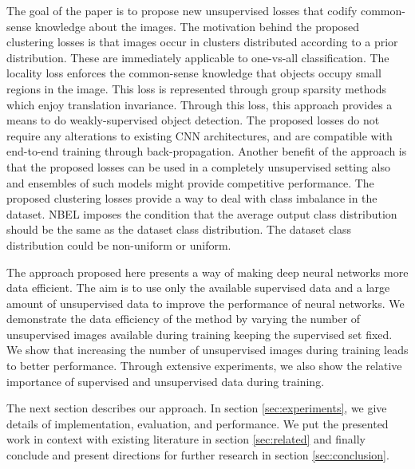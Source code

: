 The goal of the paper is to propose new unsupervised losses that codify common-sense knowledge about
the images. The motivation behind the proposed clustering losses is that images occur in clusters
distributed according to a prior distribution. These are immediately applicable to one-vs-all
classification. The locality loss enforces the common-sense knowledge
that objects occupy small regions in the image. This loss is represented through group sparsity
methods which enjoy translation invariance. Through this loss, this approach provides a means to do
weakly-supervised object detection.
The proposed losses do not require any alterations to existing CNN architectures, and are
compatible with end-to-end training through back-propagation. Another benefit of the approach is
that the proposed losses can be used in a completely unsupervised setting also and ensembles of such
models might provide competitive performance. 
The proposed clustering losses provide a way to deal with class imbalance in the dataset. NBEL
imposes the condition that the average output class distribution should be the same as the dataset
class distribution. The dataset class distribution could be non-uniform or uniform. 

The approach proposed here presents a way of making deep neural networks more data efficient. The
aim is to use only the available supervised data and a large amount of unsupervised data to improve
the performance of neural networks. We demonstrate the data efficiency of the method by varying the
number of unsupervised images available during training keeping the supervised set fixed. We show
that increasing the number of unsupervised images during training leads to better performance.
Through extensive experiments, we also show the relative importance of supervised and unsupervised
data during training. 

The next section describes our approach. In section \ref{sec:experiments}, we give details of
implementation, evaluation, and performance. We put the presented work in context with existing
literature in section \ref{sec:related} and finally conclude and present directions for further
research in section \ref{sec:conclusion}.



%
%
